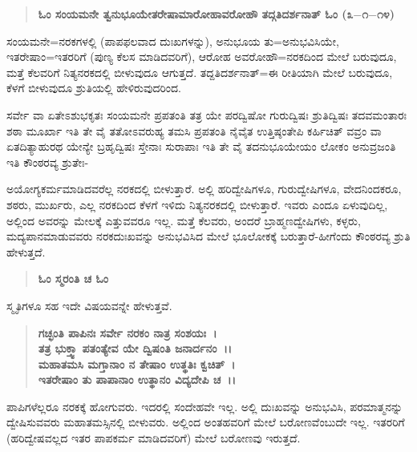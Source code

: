 \begin{verse}
\textbf{ಓಂ ಸಂಯಮನೇ ತ್ವನುಭೂಯೇತರೇಷಾಮಾರೋಹಾವರೋಹೌ ತದ್ಗತಿದರ್ಶನಾತ್ ಓಂ (೩$-$೧$-$೧೪)}
\end{verse}

ಸಂಯಮನೇ=ನರಕಗಳಲ್ಲಿ (ಪಾಪಫಲವಾದ ದುಃಖಗಳನ್ನು), ಅನುಭೂಯ ತು=ಅನು\-ಭವಿಸಿಯೇ, ಇತರೇಷಾಂ=ಇತರರಿಗೆ (ಪುಣ್ಯ ಕೆಲಸ ಮಾಡಿದವರಿಗೆ), ಆರೋಹ ಅವರೋಹೌ=ನರಕದಿಂದ ಮೇಲೆ ಬರುವುದೂ, ಮತ್ತೆ ಕೆಲವರಿಗೆ ನಿತ್ಯನರಕದಲ್ಲಿ ಬೀಳುವುದೂ ಆಗುತ್ತದೆ. ತದ್ದತಿದರ್ಶನಾತ್=ಈ ರೀತಿಯಾಗಿ ಮೇಲೆ ಬರುವುದೂ, ಕೆಳಗೆ ಬೀಳುವುದೂ ಶ್ರುತಿಯಲ್ಲಿ ಹೇಳಿರುವುದರಿಂದ.

ಸರ್ವೇ ವಾ ಏತೇಽಶುಭಕೃತಃ ಸಂಯಮನೇ ಪ್ರಪತಂತಿ ತತ್ರ ಯೇ ಪರದ್ವಿಷೋ ಗುರುದ್ವಿಷಃ ಶ್ರುತಿದ್ವಿಷಃ ತದವಮಂತಾರಃ ಶಠಾ ಮೂರ್ಖಾ ಇತಿ ತೇ ವೈ ತತೋಽವರುಹ್ಯ ತಮಸಿ ಪ್ರಪತಂತಿ ನೈವೈತ ಉತ್ತಿಷ್ಠಂತೇಪಿ ಕರ್ಹಿಚಿತ್ ವವ್ರಂ ವಾ ಏತದಿತ್ಯಾಹುರಥ ಯೇನ್ಯೇ ಬ್ರಹೃದ್ವಿಷಃ ಸ್ತೇನಾಃ ಸುರಾಪಾಃ ಇತಿ ತೇ ವೈ ತದನುಭೂಯೇಯಂ ಲೋಕಂ ಅನುವ್ರಜಂತಿ ಇತಿ ಕೌಂಠರವ್ಯ ಶ್ರುತೇಃ-

ಅಯೋಗ್ಯಕರ್ಮಮಾಡಿದವರೆಲ್ಲ ನರಕದಲ್ಲಿ ಬೀಳುತ್ತಾರೆ. ಅಲ್ಲಿ ಹರಿದ್ವೇಷಿಗಳೂ, ಗುರುದ್ವೇಷಿಗಳೂ, ವೇದನಿಂದಕರೂ, ಶಠರು, ಮುರ್ಖರು, ಎಲ್ಲ ನರಕದಿಂದ ಕೆಳಗೆ ಇಳಿದು ನಿತ್ಯನರಕದಲ್ಲಿ ಬೀಳುತ್ತಾರೆ. ಇವರು ಎಂದೂ ಏಳುವುದಿಲ್ಲ, ಅಲ್ಲಿಂದ ಅವರನ್ನು ಮೇಲಕ್ಕೆ ಎತ್ತುವವರೂ ಇಲ್ಲ. ಮತ್ತೆ ಕೆಲವರು, ಅಂದರೆ ಬ್ರಾಹ್ಮಣದ್ವೇಷಿಗಳು, ಕಳ್ಳರು, ಮದ್ಯಪಾನಮಾಡುವವರು ನರಕದುಃಖವನ್ನು ಅನುಭವಿಸಿದ ಮೇಲೆ ಭೂಲೋಕಕ್ಕೆ ಬರುತ್ತಾರೆ-ಹೀಗೆಂದು ಕೌಂಠರವ್ಯ ಶ್ರುತಿ ಹೇಳುತ್ತದೆ.

\vspace{-.1cm}

\begin{verse}
\textbf{ಓಂ ಸ್ಮರಂತಿ ಚ ಓಂ}
\end{verse}

\vspace{-.1cm}

ಸ್ಮೃತಿಗಳೂ ಸಹ ಇದೇ ವಿಷಯವನ್ನೇ ಹೇಳುತ್ತವೆ.

\vspace{-.1cm}

\begin{verse}
\textbf{ಗಚ್ಛಂತಿ ಪಾಪಿನಃ ಸರ್ವೇ ನರಕಂ ನಾತ್ರ ಸಂಶಯಃ~।}\\\textbf{ತತ್ರ ಭುಕ್ತ್ವಾ ಪತಂತ್ಯೇವ ಯೇ ದ್ವಿಷಂತಿ ಜನಾರ್ದನಂ~।।}\\\textbf{ಮಹಾತಮಸಿ ಮಗ್ತಾನಾಂ ನ ತೇಷಾಂ ಉತ್ಥತಿಃ ಕ್ವಚಿತ್~।}\\\textbf{ಇತರೇಷಾಂ ತು ಪಾಪಾನಾಂ ಉತ್ಥಾನಂ ವಿದ್ಯದೇಪಿ ಚ~।।}
\end{verse}

\vspace{-.1cm}

ಪಾಪಿಗಳೆಲ್ಲರೂ ನರಕಕ್ಕೆ ಹೋಗುವರು. ಇದರಲ್ಲಿ ಸಂದೇಹವೇ ಇಲ್ಲ. ಅಲ್ಲಿ ದುಃಖವನ್ನು ಅನುಭವಿಸಿ, ಪರಮಾತ್ಮನನ್ನು ದ್ವೇಷಿಸುವವರು ಮಹಾತಮಸ್ಸಿನಲ್ಲಿ ಬೀಳುವರು. ಅಲ್ಲಿಂದ ಅಂತಹವರಿಗೆ ಮೇಲೆ ಬರೋಣವೆಂಬುದೇ ಇಲ್ಲ. ಇತರರಿಗೆ (ಹರಿದ್ವೇಷವಲ್ಲದ ಇತರ ಪಾಪಕರ್ಮ ಮಾಡಿದವರಿಗೆ) ಮೇಲೆ ಬರೋಣವು ಇರುತ್ತದೆ.

